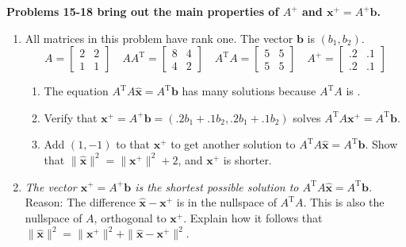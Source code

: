 \documentclass[14pt, a4paper]{article}
\begin{document}
\noindent \textbf{Problems 15-18 bring out the main properties of $A^+$ and $\boldsymbol{x}^+ = A^+\boldsymbol{b}$.}
\begin{enumerate}[resume]
    \item All matrices in this problem have rank one. The vector $\boldsymbol{b}$ is $(b_1, b_2)$.
          \[
              A = \begin{bmatrix} 2 & 2 \\ 1 & 1 \end{bmatrix} \quad AA^{\mathrm{T}} = \begin{bmatrix} 8 & 4 \\ 4 & 2 \end{bmatrix} \quad A^{\mathrm{T}}A = \begin{bmatrix} 5 & 5 \\ 5 & 5 \end{bmatrix} \quad A^+ = \begin{bmatrix} .2 & .1 \\ .2 & .1 \end{bmatrix}
          \]
          \begin{enumerate}
              \item The equation $A^{\mathrm{T}}A\widehat{\boldsymbol{x}} = A^{\mathrm{T}}\boldsymbol{b}$ has many solutions because $A^{\mathrm{T}}A$ is \underline{\hspace{1cm}}.
              \item Verify that $\boldsymbol{x}^+ = A^+\boldsymbol{b} = (.2b_1 + .1b_2, .2b_1 + .1b_2)$ solves $A^{\mathrm{T}}A\boldsymbol{x}^+ = A^{\mathrm{T}}\boldsymbol{b}$.
              \item Add $(1, -1)$ to that $\boldsymbol{x}^+$ to get another solution to $A^{\mathrm{T}}A\widehat{\boldsymbol{x}} = A^{\mathrm{T}}\boldsymbol{b}$. Show that $\|\widehat{\boldsymbol{x}}\|^2 = \|\boldsymbol{x}^+\|^2 + 2$, and $\boldsymbol{x}^+$ is shorter.
          \end{enumerate}

    \item \textit{The vector $\boldsymbol{x}^+ = A^+\boldsymbol{b}$ is the shortest possible solution to $A^{\mathrm{T}}A\widehat{\boldsymbol{x}} = A^{\mathrm{T}}\boldsymbol{b}$.} \\
          Reason: The difference $\widehat{\boldsymbol{x}} - \boldsymbol{x}^+$ is in the nullspace of $A^{\mathrm{T}}A$. This is also the nullspace of $A$, orthogonal to $\boldsymbol{x}^+$. Explain how it follows that $\|\widehat{\boldsymbol{x}}\|^2 = \|\boldsymbol{x}^+\|^2 + \|\widehat{\boldsymbol{x}} - \boldsymbol{x}^+\|^2$.


\end{enumerate}
\end{document}
